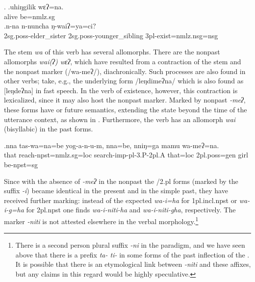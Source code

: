 \ex. \ag.uhiŋgilik wɛʔ=na.\\
alive be{\sc [npst;3sg]=nmlz.sg}\\ 
\bg.n-na n-nuncha ŋ-waiʔ=ya=ci?\\
{\sc 2sg.poss-}elder\_sister  {\sc 2sg.poss-}younger\_sibling {\sc 3pl-}exist{\sc [npst]=nmlz.nsg=nsg}\\


The stem \emph{wa} of this verb has several allomorphs. There are the nonpast allomorphs \emph{wai(ʔ) \ti wɛʔ}, which have resulted from a contraction of the stem and the nonpast marker (/wa-meʔ/), diachronically. Such processes are also found in other verbs; take, e.g., the underlying form /leŋdimeʔna/ which is also found as [leŋdeʔna] in fast speech. In the verb of existence, however, this contraction is lexicalized, since it may also host the nonpast marker. Marked by nonpast \emph{-meʔ}, these forms have  or future semantics, extending the state beyond the time of the utterance context, as shown in \Next. Furthermore, the verb has an allomorph \emph{wai} (bisyllabic) in the past forms. 

\exg.nna  tas-wa=na=be  yog-a-n-u-m,      nna=be,    nniŋ=ga       mamu wa-meʔ=na.\\
that reach{\sc -npst=nmlz.sg=loc} search{\sc -imp-pl-3.P-2pl.A} that{\sc =loc} {\sc 2pl.poss=gen} girl be{\sc [3sg]-npst=sg}\\
 


Since with the absence of \emph{-meʔ} in the nonpast the {/2.pl} forms (marked by the suffix \emph{-i}) became identical in the present and in the simple past, they have received further marking: instead of the expected \emph{wa-i=ha} for {\sc 1pl.incl.npst} or \emph{wa-i-g=ha} for {\sc 2pl.npst} one finds \emph{wa-i-niti-ha} and \emph{wa-i-niti-gha}, respectively. The marker \emph{-niti} is not attested elsewhere in the verbal morphology.\footnote{There is a second person plural suffix \emph{-ni} in the  paradigm, and we have seen above that there is a prefix \emph{ta- \ti ti-} in some forms of the past inflection of the . It is possible that there is an etymological link between \emph{-niti} and these affixes, but any claims in this regard would be highly speculative.}

